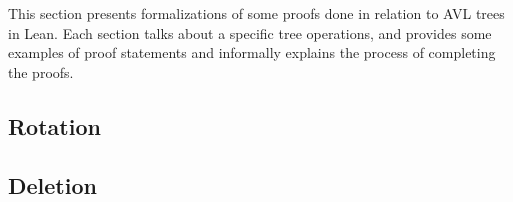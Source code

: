 This section presents formalizations of some proofs done in relation to AVL trees in Lean. Each section talks about a specific tree operations, and provides some examples of proof statements and informally explains the process of completing the proofs.

% 

\subsection{Rotation}


% 

\subsection{Deletion}

